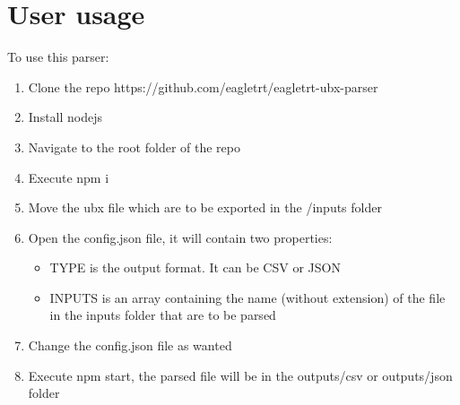 \section{\huge{User usage}}
To use this parser:
\begin{enumerate}
    \item Clone the repo https://github.com/eagletrt/eagletrt-ubx-parser
    \item Install nodejs
    \item Navigate to the root folder of the repo
    \item Execute npm i
    \item Move the ubx file which are to be exported in the /inputs folder
    \item Open the config.json file, it will contain two properties:
        \begin{itemize}
            \item TYPE is the output format. It can be CSV or JSON
            \item INPUTS is an array containing the name (without extension) of the file in the inputs folder that are to be parsed
        \end{itemize}
    \item Change the config.json file as wanted
    \item Execute npm start, the parsed file will be in the outputs/csv or outputs/json folder
\end{enumerate}